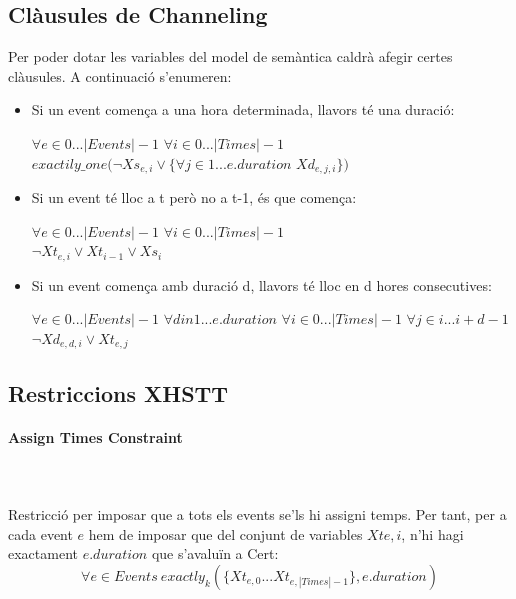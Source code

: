 \documentclass[11pt,a4paper,twoside]{report}
\begin{document}
  \subsection{Clàusules de Channeling}

  Per poder dotar les variables del model de semàntica caldrà afegir certes clàusules. A continuació s'enumeren:
  \begin{itemize}
    \item Si un event comença a una hora determinada, llavors té una duració: \begin{center} $\forall e \in 0 ... |Events|-1$ $\forall i \in 0 ... |Times|-1$ \\$exactily\_one(\neg Xs_{e,i} \vee \{ \forall j \in 1 ... e.duration$ $Xd_{e,j,i}\})$\end{center}
    \item Si un event té lloc a t però no a t-1, és que comença: \begin{center} $\forall e \in 0 ... |Events|-1$ $\forall i \in 0 ... |Times|-1$ \\$\neg Xt_{e,i} \vee Xt_{i-1} \vee Xs_i$ \end{center}
    \item Si un event comença amb duració d, llavors té lloc en d hores consecutives: \begin{center} 
      $\forall e \in 0 ... |Events|-1$ $\forall d in 1 ... e.duration$ $\forall i \in 0 ... |Times|-1$ $\forall j \in i ... i+d-1$ \\
      $\neg Xd_{e,d,i} \vee Xt_{e,j}$
    
    \end{center}
  \end{itemize}

  \subsection{Restriccions XHSTT}
  \paragraph*{Assign Times Constraint} ~\\~\\
  
  Restricció per imposar que a tots els events se'ls hi assigni temps. Per tant, per a cada event $e$ hem de imposar que del conjunt de variables $Xt{e,i}$, n'hi hagi exactament $e.duration$ que s'avaluïn a Cert:
  \[
    \forall e \in Events \ exactly_k(\{Xt_{e,0} ... Xt_{e,|Times|-1}\}, e.duration)
  \]
\end{document}
